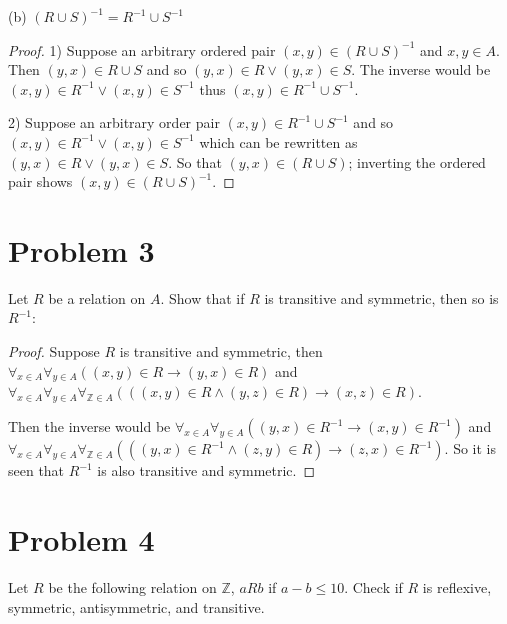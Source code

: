\documentclass{article}
\begin{document}
    (b) $(R\cup S)^{-1} = R^{-1}\cup S^{-1}$

    \begin{proof}
        1) Suppose an arbitrary ordered pair $(x,y)\in (R\cup S)^{-1}$ and $x,y\in A$. Then 
        $(y,x)\in R\cup S$ and so $(y,x)\in R \lor (y,x)\in S$. The inverse would be 
        $(x,y)\in R^{-1} \lor (x,y)\in S^{-1}$ thus $(x,y)\in R^{-1}\cup S^{-1}$.

        2) Suppose an arbitrary order pair $(x,y)\in R^{-1}\cup S^{-1}$ and so 
        $(x,y)\in R^{-1}\lor (x,y)\in S^{-1}$ which can be rewritten as $(y,x)\in R \lor (y,x)\in S$.
        So that $(y,x)\in (R\cup S)$; inverting the ordered pair shows $(x,y)\in (R\cup S)^{-1}$.
    \end{proof}


    \section*{Problem 3}

    Let $R$ be a relation on $A$. Show that if $R$ is transitive and symmetric,
    then so is $R^{-1}$:

    \begin{proof}
        Suppose $R$ is transitive and symmetric, then 
        $\forall_{x\in A}\forall_{y\in A}((x,y)\in R \rightarrow (y,x)\in R)$ and
        $\forall_{x\in A}\forall_{y\in A}\forall_{\mathbb{Z}\in A}(((x,y)\in R \land (y,z)\in R) \rightarrow (x,z)\in R)$.

        Then the inverse would be 
        $\forall_{x\in A}\forall_{y\in A}((y,x)\in R^{-1} \rightarrow (x,y)\in R^{-1})$ and
        $\forall_{x\in A}\forall_{y\in A}\forall_{\mathbb{Z}\in A}(((y,x)\in R^{-1} \land (z, y)\in R) \rightarrow (z,x)\in R^{-1})$.
        So it is seen that $R^{-1}$ is also transitive and symmetric.
    \end{proof}


    \section*{Problem 4}

    Let $R$ be the following relation on $\mathbb{Z}$, $aRb$ if $a-b\leq 10$. Check if $R$ is
    reflexive, symmetric, antisymmetric, and transitive. 
\end{document}
